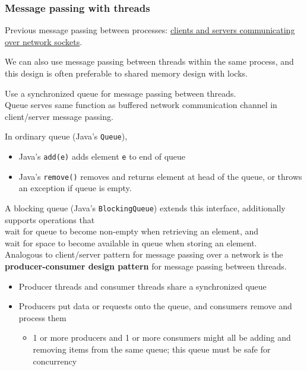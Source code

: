 \documentclass[10pt]{amsart}
\begin{document}
\begin{multicols*}{2}
\subsubsection{Message passing with threads}

Previous message passing between processes: \href{http://web.mit.edu/6.005/www/fa15/classes/21-sockets-networking/#network_sockets}{clients and servers communicating over network sockets}. 

We can also use message passing between threads within the same process, and this design is often preferable to shared memory design with locks.

Use a synchronized queue for message passing between threads. \\
Queue serves same function as buffered network communication channel in client/server message passing.

In ordinary queue (Java's \texttt{Queue}), \\
\begin{itemize}
	\item Java's \texttt{add(e)} adds element \texttt{e} to end of queue
	\item Java's \texttt{remove()} removes and returns element at head of the queue, or throws an exception if queue is empty.
\end{itemize}

A blocking queue (Java's \verb|BlockingQueue|) extends this interface, additionally supports operations that \\
wait for queue to become non-empty when retrieving an element, and \\
wait for space to become available in queue when storing an element. \\

Analogous to client/server pattern for message passing over a network is the \textbf{producer-consumer design pattern} for message passing between threads. 
\begin{itemize} 
\item Producer threads and consumer threads share a synchronized queue
\item Producers put data or requests onto the queue, and consumers remove and process them
\begin{itemize}
	\item 1 or more producers and 1 or more consumers might all be adding and removing items from the same queue; this queue must be safe for concurrency
\end{itemize}
\end{itemize} 


\end{multicols*}
\end{document}
